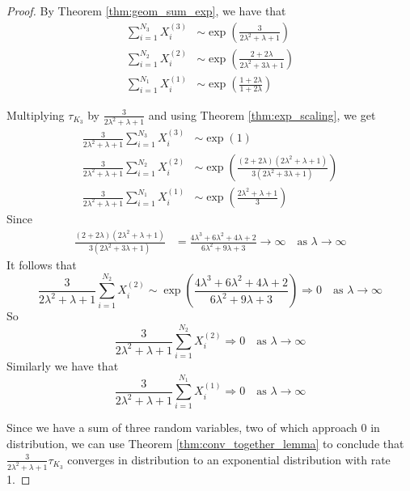 \begin{proof}
By Theorem \eqref{thm:geom_sum_exp}, we have that
\begin{align*}
    \sum_{i = 1}^{N_3} X_i^{(3)} &\sim \exp\left(
        \frac{3}{2\lambda^2 + \lambda + 1}
        \right) \\
    \sum_{i = 1}^{N_2} X_i^{(2)} &\sim \exp\left(
        \frac{2 + 2\lambda}{2 \lambda^2 + 3\lambda + 1}
    \right)\\
    \sum_{i = 1}^{N_1} X_i^{(1)} &\sim \exp\left(\frac{1 + 2\lambda}{1 + 2\lambda}\right)
\end{align*}

Multiplying $\tau_{K_3}$ by $\frac{3}{2 \lambda^2 + \lambda + 1}$ and using Theorem \eqref{thm:exp_scaling}, we get
\begin{align*}
    \frac{3}{2 \lambda^2 + \lambda + 1} \sum_{i = 1}^{N_3} X_i^{(3)} &\sim \exp\left(
        1
        \right)\\
    \frac{3}{2 \lambda^2 + \lambda + 1} \sum_{i = 1}^{N_2} X_i^{(2)} &\sim \exp\left(
        \frac{(2 + 2\lambda)(2 \lambda^2 + \lambda + 1)}{3 (2 \lambda^2 + 3\lambda + 1)}
    \right)\\
    \frac{3}{2 \lambda^2 + \lambda + 1} \sum_{i = 1}^{N_1} X_i^{(1)} &\sim \exp\left(
        \frac{2 \lambda^2 + \lambda + 1}{3}
    \right)
\end{align*}
Since
\begin{align*}
    \frac{(2 + 2\lambda)(2 \lambda^2 + \lambda + 1)}{3 (2 \lambda^2 + 3\lambda + 1)} &= \frac{4\lambda^3 + 6 \lambda^2 + 4 \lambda + 2}{6\lambda^2 + 9\lambda + 3}
    \to \infty \quad \text{as } \lambda \to \infty
\end{align*}
It follows that
$$
    \frac{3}{2 \lambda^2 + \lambda + 1} \sum_{i = 1}^{N_2} X_i^{(2)} \sim \exp\left(
        \frac{4\lambda^3 + 6 \lambda^2 + 4 \lambda + 2}{6\lambda^2 + 9\lambda + 3}
    \right) \Rightarrow 0 \quad \text{as } \lambda \to \infty
$$
So
$$
\frac{3}{2 \lambda^2 + \lambda + 1} \sum_{i = 1}^{N_2} X_i^{(2)} \Rightarrow 0 \quad \text{as } \lambda \to \infty
$$
Similarly we have that
$$
\frac{3}{2 \lambda^2 + \lambda + 1} \sum_{i = 1}^{N_1} X_i^{(1)} \Rightarrow 0 \quad \text{as } \lambda \to \infty
$$

Since we have a sum of three random variables, two of which approach 0 in distribution, we can use Theorem \ref{thm:conv_together_lemma} to conclude that  $\frac{3}{2 \lambda^2 + \lambda + 1} \tau_{K_3}$ converges in distribution to an exponential distribution with rate 1.
\end{proof}

